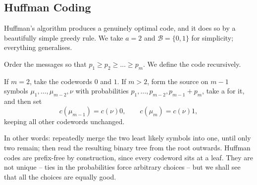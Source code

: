 \documentclass[a4paper]{scrartcl}
\newcommand{\Bc}{\mathcal{B}}
\begin{document}
\subsection{Huffman Coding}

Huffman's algorithm produces a genuinely optimal code, and it does so by a beautifully simple greedy rule. We take $a = 2$ and $\Bc = \{0,1\}$ for simplicity; everything generalises.

Order the messages so that $p_1 \ge p_2 \ge \dots \ge p_m$. We define the code recursively.

\begin{definition}
	If $m = 2$, take the codewords $0$ and $1$. If $m > 2$, form the source on $m-1$ symbols $\mu_1, \dots, \mu_{m-2}, \nu$ with probabilities $p_1, \dots, p_{m-2}, p_{m-1}+p_m$, take a  for it, and then set
	$$c(\mu_{m-1}) = c(\nu)0, \qquad c(\mu_m) = c(\nu)1,$$
	keeping all other codewords unchanged.
\end{definition}

In other words: repeatedly merge the two least likely symbols into one, until only two remain; then read the resulting binary tree from the root outwards. Huffman codes are prefix-free by construction, since every codeword sits at a leaf. They are not unique -- ties in the probabilities force arbitrary choices -- but we shall see that all the choices are equally good.
\end{document}
